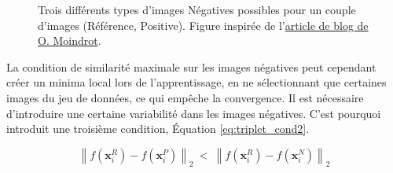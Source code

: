 \begin{figure}[hbtp]
	\centering
	
	\caption{Trois différents types d'images Négatives possibles pour un couple d'images (Référence, Positive). Figure inspirée de l'\href{https://omoindrot.github.io/triplet-loss}{article de blog de O. Moindrot}.}
	\label{fig:triplet_neg}
\end{figure}

La condition de similarité maximale sur les images négatives peut cependant créer un minima local lors de l'apprentissage, en ne sélectionnant que certaines images du jeu de données, ce qui empêche  la convergence.
Il est nécessaire d'introduire une certaine variabilité dans les images négatives.
C'est pourquoi \cite{schroff_facenet_2015} introduit une troisième condition, Équation \ref{eq:triplet_cond2}.

\begin{equation} \label{eq:triplet_cond2}
\left\|f\left(\mathbf{x}_{i}^{R}\right)-f\left(\mathbf{x}_{i}^{P}\right)\right\|_{2} \ < \ \left\|f\left(\mathbf{x}_{i}^{R}\right)-f\left(\mathbf{x}_{i}^{N}\right)\right\|_{2}
\end{equation}

